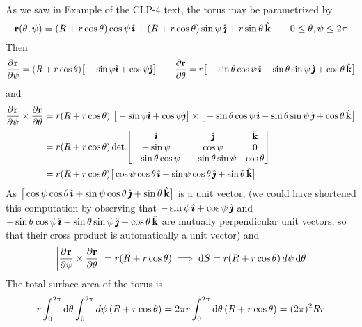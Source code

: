 \begin{solution} 
As we saw in Example  of the CLP-4 text,
the torus may be parametrized by
\begin{equation*}
\mathbf{r}(\theta,\psi)
  = (R+r\cos\theta)\cos\psi\,\hat{\pmb{\imath}}
    +(R+r\cos\theta)\sin\psi\,\hat{\pmb{\jmath}}
    + r\sin\theta\,\hat{\mathbf{k}}\qquad
0\le\theta,\psi\le 2\pi
\end{equation*}
Then
\begin{equation*}
\pdiff{\vr}{\psi}=(R+r\cos\theta)\big[-\sin\psi\hi+\cos\psi\hj\big]\qquad
\pdiff{\vr}{\theta}=r\big[-\sin\theta\cos\psi\,\hi-\sin\theta\sin\psi\,\hj
               +\cos\theta\,\hk\big]
\end{equation*}
and
\begin{align*}
\pdiff{\vr}{\psi}\times\pdiff{\vr}{\theta}
&=r(R+r\cos\theta)\ \big[-\sin\psi\hi+\cos\psi\hj\big]\times
           \big[-\sin\theta\cos\psi\,\hi-\sin\theta\sin\psi\,\hj
               +\cos\theta\,\hk\big] \\
&=r(R+r\cos\theta)\det\left[\begin{matrix}
                 \hi   &   \hj               &   \hk   \\
            -\sin\psi  & \cos\psi            & 0       \\
   -\sin\theta\cos\psi & -\sin\theta\sin\psi & \cos\theta 
    \end{matrix}\right] \\
&=r(R+r\cos\theta) \big[\cos\psi\cos\theta\,\hi +\sin\psi\cos\theta\,\hj
                          +\sin\theta\,\hk\big]
\end{align*}
As $\big[\cos\psi\cos\theta\,\hat{\pmb{\imath}} +\sin\psi\cos\theta\,\hat{\pmb{\jmath}}
                          +\sin\theta\,\hat{\mathbf{k}}\big]$ is a unit vector,
(we could have shortened this computation by observing that $-\sin\psi\,\hat{\pmb{\imath}}+\cos\psi\,\hat{\pmb{\jmath}}$ and
 $-\sin\theta\cos\psi\,\hat{\pmb{\imath}}-\sin\theta\sin\psi\,\hat{\pmb{\jmath}}+\cos\theta\,\hat{\mathbf{k}}$ 
are mutually perpendicular unit vectors, so that their cross product is 
automatically a unit vector) and
\begin{equation*}
\left|\pdiff{\vr}{\psi}\times\pdiff{\vr}{\theta}\right|
=r(R+r\cos\theta)
\implies \dee{S}=r(R+r\cos\theta)\,d\psi\,\dee{\theta}
\end{equation*}
The total surface area of the torus is
\begin{equation*}
r\int_0^{2\pi}\mathrm{d}\theta\int_0^{2\pi}d\psi\,(R+r\cos\theta)
=2\pi r \int_0^{2\pi}\mathrm{d}\theta\,(R+r\cos\theta)
=(2\pi)^2 Rr
\end{equation*}
\end{solution}

